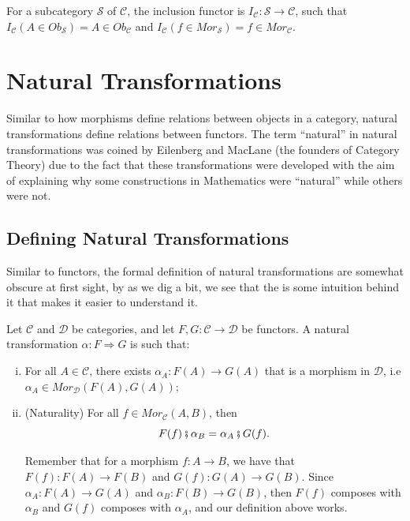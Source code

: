 \begin{example}
  For a subcategory $\mathcal S$ of $\mathcal C$, the inclusion
  functor is $I_\mathcal C : \mathcal S \to \mathcal C$, such that
  $I_\mathcal C (A \in Ob_\mathcal S) = A \in Ob_\mathcal C$ and
  $I_\mathcal C (f \in Mor_\mathcal S) = f \in Mor_\mathcal C$.
\end{example}


\section{Natural Transformations}

Similar to how morphisms define relations between objects in a category, natural transformations
define relations between functors.
The term ``natural'' in natural transformations was coined by Eilenberg and MacLane (the founders
of Category Theory) due to the fact that these transformations were developed with the
aim of explaining why some constructions in Mathematics were ``natural'' while others
were not.


\subsection{Defining Natural Transformations}

Similar to functors, the formal definition of natural transformations
are somewhat obscure at first sight, by as we dig a bit, we see that the is
some intuition behind it that makes it easier to understand it.

\begin{definition}
  Let $\mathcal C$ and $\mathcal D$ be categories, and let $F,G:\mathcal C \to \mathcal D$ be functors.
  A natural transformation $\alpha: F \Rightarrow G$ is such that:
  \begin{enumerate}[(i)]
    \item For all $A \in \mathcal C$, there exists $\alpha_A :F(A) \to G(A)$ that is
      a morphism in $\mathcal D$, i.e $\alpha_A \in Mor_\mathcal D (F(A), G(A))$;
    \item (Naturality) For all $f \in Mor_\mathcal C (A,B)$, then
      \begin{displaymath}
        F(f)\fatsemi \alpha_B = \alpha_A \fatsemi G(f).
      \end{displaymath}

    Remember that for a morphism $f:A \to B$, we have that $F(f):F(A)\to F(B)$ and $G(f):G(A) \to G(B)$.
    Since $\alpha_A: F(A) \to G(A)$ and $\alpha_B : F(B) \to G(B)$, then $F(f)$ composes
    with $\alpha_B$ and $G(f)$ composes with $\alpha_A$, and our definition above works.
  \end{enumerate}
  \label{def:NaturalTransformation}
\end{definition}

